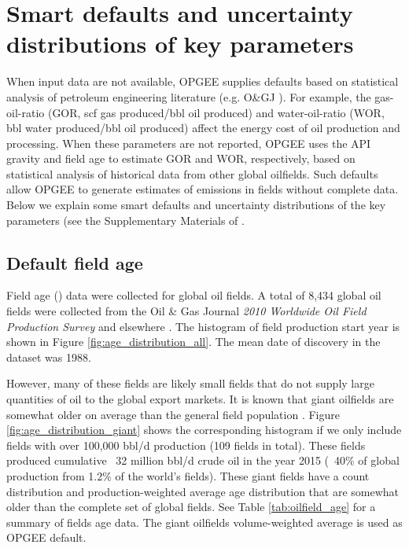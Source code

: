 \documentclass[11pt]{report}
\newcommand{\xlname}[1]{\raisebox{1pt}{\fcolorbox{light-gray}{light-gray}{\texttt{\textcolor{stanford}{\scriptsize{#1}}}}}}
\begin{document}
\clearpage

\section{Smart defaults and uncertainty distributions of key parameters}
\label{sec:smart_defaults}

When input data are not available, OPGEE supplies defaults based on statistical analysis of petroleum engineering literature (e.g. O\&GJ \cite{OGJ2009a}). For example, the gas-oil-ratio (GOR, scf gas produced/bbl oil produced) and water-oil-ratio (WOR, bbl water produced/bbl oil produced) affect the energy cost of oil production and processing. When these parameters are not reported, OPGEE uses the API gravity and field age to estimate GOR and WOR, respectively, based on statistical analysis of historical data from other global oilfields. Such defaults allow OPGEE to generate estimates of emissions in fields without complete data. Below we explain some smart defaults and uncertainty distributions of the key parameters (see the Supplementary Materials of \cite{Masnadi2018}. 

\subsection{Default field age}

Field age (\xlname{Field\_age}) data were collected for global oil fields. A total of 8,434 global oil fields were collected from the Oil \& Gas Journal \emph{2010 Worldwide Oil Field Production Survey} \cite{OGJ2009a} and elsewhere \cite{Masnadi2018}. The histogram of field production start year is shown in Figure \ref{fig:age_distribution_all}. The mean date of discovery in the dataset was 1988.

 However, many of these fields are likely small fields that do not supply large quantities of oil to the global export markets. It is known that giant oilfields are somewhat older on average than the general field population \cite{Simmons2005, Simmons2006, Deffeyes2001, Deffeyes2005}. Figure \ref{fig:age_distribution_giant} shows the corresponding histogram if we only include fields with over 100,000 bbl/d production (109 fields in total). These fields produced cumulative ~32 million bbl/d crude oil in the year 2015 (~40\% of global production from 1.2\% of the world's fields). These giant fields have a count distribution and production-weighted average age distribution that are somewhat older than the complete set of global fields. See Table \ref{tab:oilfield_age} for a summary of fields age data. The giant oilfields volume-weighted average is used as OPGEE default. 
 
\end{document}
